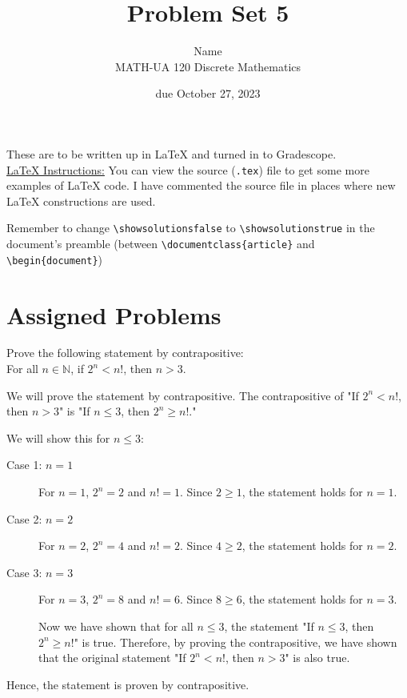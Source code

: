 \documentclass{article}
\title{Problem Set 5}
\author{%
    Name
\\  MATH-UA 120 Discrete Mathematics
}
\date{due October 27, 2023}
\newif\ifshowsolutions
\newcommand{\danger}{\marginpar[\hfill\dbend]{\dbend\hfill}}
\theoremstyle{definition}
\begin{document}
\maketitle



These are to be written up in \LaTeX{} and turned in to Gradescope.\\



\ifshowsolutions
    \SetupExSheets{solution/print=true}
\else
    \danger
 \underline{ \LaTeX{}  Instructions:}  You can view the source (\texttt{.tex}) file to get some more examples of \LaTeX{} code.  I have commented the source file in places where new \LaTeX{} constructions are used.
  
  Remember to change \verb|\showsolutionsfalse| to \verb|\showsolutionstrue|
    in the document's preamble 
    (between \verb|\documentclass{article}| and \verb|\begin{document}|)
\fi

\section*{Assigned Problems}

\begin{question}
    Prove the following statement by contrapositive: \\
    For all $n\in \mathbb{N}$, if $2^n<n!$, then $n>3$.
\end{question}
\begin{solution}
We will prove the statement by contrapositive. The contrapositive of "If $2^n < n!$, then $n > 3$" is "If $n \leq 3$, then $2^n \geq n!$."

We will show this for $n \leq 3$:

\begin{description}
\item[Case 1: $n = 1$] 
For $n = 1$, $2^n = 2$ and $n! = 1$. Since $2 \geq 1$, the statement holds for $n = 1$.

\item[Case 2: $n = 2$]
For $n = 2$, $2^n = 4$ and $n! = 2$. Since $4 \geq 2$, the statement holds for $n = 2$.

\item[Case 3: $n = 3$]
For $n = 3$, $2^n = 8$ and $n! = 6$. Since $8 \geq 6$, the statement holds for $n = 3$.

Now we have shown that for all $n \leq 3$, the statement "If $n \leq 3$, then $2^n \geq n!$" is true. Therefore, by proving the contrapositive, we have shown that the original statement "If $2^n < n!$, then $n > 3$" is also true.
\end{description}
Hence, the statement is proven by contrapositive.
\end{solution}
\end{document}
